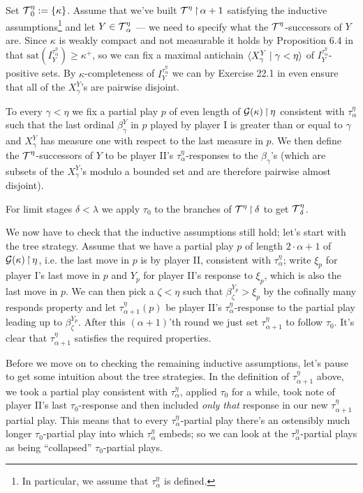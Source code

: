\documentclass[../../main]{subfiles}
\begin{document}
{	\qquad Set $\operatorname{\mathcal T}^\eta_0:=\{\kappa\}$. Assume that we've built $\operatorname{\mathcal T}^\eta\operatorname{\upharpoonright}\alpha+1$ satisfying the inductive assumptions\footnote{In particular, we assume that $\tau^\eta_\alpha$ is defined.} and let $Y\in\operatorname{\mathcal T}^\eta_\alpha$ --- we need to specify what the $\operatorname{\mathcal T}^\eta$-successors of $Y$ are. Since $\kappa$ is weakly compact and not measurable it holds by Proposition 6.4 in \cite{Kanamori} that $\text{sat}(I_Y^{\tau^\eta_\alpha})\geq\kappa^+$, so we can fix a maximal antichain $\langle X_\gamma^Y\mid\gamma<\eta\rangle$ of $I_Y^{\tau^\eta_\alpha}$-positive sets. By $\kappa$-completeness of $I_Y^{\tau^\eta_\alpha}$ we can by Exercise 22.1 in \cite{Jech} even ensure that all of the $X_\gamma^Y$'s are pairwise disjoint.
	
	\qquad To every $\gamma<\eta$ we fix a partial play $p$ of even length of $\operatorname{\mathcal G}(\kappa)\operatorname{\upharpoonright}\eta$ consistent with $\tau^\eta_\alpha$ such that the last ordinal $\beta_\gamma^Y$ in $p$ played by player I is greater than or equal to $\gamma$ and $X_\gamma^Y$ has measure one with respect to the last measure in $p$. We then define the $\operatorname{\mathcal T}^\eta$-successors of $Y$ to be player II's $\tau^\eta_\alpha$-responses to the $\beta_\gamma$'s (which are subsets of the $X_\gamma^Y$'s modulo a bounded set and are therefore pairwise almost disjoint).

  \qquad For limit stages $\delta<\lambda$ we apply $\tau_0$ to the branches of $\operatorname{\mathcal T}^\eta\operatorname{\upharpoonright}\delta$ to get $\operatorname{\mathcal T}^\eta_\delta$.

\qquad We now have to check that the inductive assumptions still hold; let's start with the tree strategy. Assume that we have a partial play $p$ of length $2\cdot\alpha+1$ of $\operatorname{\mathcal G}(\kappa)\operatorname{\upharpoonright}\eta$, i.e. the last move in $p$ is by player II, consistent with $\tau^\eta_\alpha$; write $\xi_p$ for player I's last move in $p$ and $Y_p$ for player II's response to $\xi_p$, which is also the last move in $p$. We can then pick a $\zeta<\eta$ such that $\beta_\zeta^{Y_p}>\xi_p$ by the cofinally many responds property and let $\tau^\eta_{\alpha+1}(p)$ be player II's $\tau^\eta_\alpha$-response to the partial play leading up to $\beta_\zeta^{Y_p}$. After this $(\alpha+1)$'th round we just set $\tau^\eta_{\alpha+1}$ to follow $\tau_0$. It's clear that $\tau^\eta_{\alpha+1}$ satisfies the required properties.

  \qquad Before we move on to checking the remaining inductive assumptions, let's pause to get some intuition about the tree strategies. In the definition of $\tau^\eta_{\alpha+1}$ above, we took a partial play consistent with $\tau^\eta_\alpha$, applied $\tau_0$ for a while, took note of player II's last $\tau_0$-response and then included \textit{only that} response in our new $\tau^\eta_{\alpha+1}$ partial play. This means that to every $\tau^\eta_\alpha$-partial play there's an ostensibly much longer $\tau_0$-partial play into which $\tau^\eta_\alpha$ embeds; so we can look at the $\tau^\eta_\alpha$-partial plays as being ``collapsed'' $\tau_0$-partial plays.

}
\end{document}
